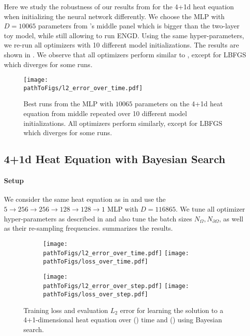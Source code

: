 Here we study the robustness of our results from  for the 4+1d heat equation when initializing the neural network differently.
We choose the MLP with $D=\num{10065}$ parameters from 's middle panel which is bigger than the two-layer toy model, while still allowing to run ENGD.
Using the same hyper-parameters, we re-run all optimizers with 10 different model initializations.
The results are shown in .
We observe that all optimizers perform similar to , except for LBFGS which diverges for some runs.

\begin{figure}[!h]
  \centering
  \def\pathToFigs{kfac_pinns_exp/exp41_errorbars_exp28}
  \texttt{[image: \\pathToFigs/l2\_error\_over\_time.pdf]}
  \caption{Best runs from the MLP with $\num{10065}$ parameters on the 4+1d heat equation from  middle repeated over 10 different model initializations. All optimizers perform similarly, except for LBFGS which diverges for some runs.}
  \label{fig:heat4d-robustness-appendix}
\end{figure}

\subsection{4+1d Heat Equation with Bayesian Search}\label{sec:4d-heat-bayes-app}

\paragraph{Setup} We consider the same heat equation as in  and use the $5 \to 256 \to 256\to 128 \to 128 \to 1$ MLP with $D=\num{116865}$.
We tune all optimizer hyper-parameters as described in  and also tune the batch sizes $N_{\Omega}, N_{\partial \Omega}$, as well as their re-sampling frequencies.
 summarizes the results.

\begin{figure}[!h]
  \centering
  \def\pathToFigs{kfac_pinns_exp/exp31_heat4d_mlp_tanh_256_bayes}
  \begin{subfigure}[t]{1.0\linewidth}
    \caption{}\label{subfig:heat4d-bayes-time}
    \texttt{[image: \\pathToFigs/l2\_error\_over\_time.pdf]}
    \texttt{[image: \\pathToFigs/loss\_over\_time.pdf]}
  \end{subfigure}
  \begin{subfigure}[t]{1.0\linewidth}
    \caption{}\label{subfig:heat4d-bayes-step}
    \texttt{[image: \\pathToFigs/l2\_error\_over\_step.pdf]}
    \texttt{[image: \\pathToFigs/loss\_over\_step.pdf]}
  \end{subfigure}
  \caption{Training loss and evaluation $L_2$ error for learning the solution to a 4+1-dimensional heat equation over () time and () using Bayesian search.}\label{fig:heat4d-bayes-appendix}
\end{figure}

